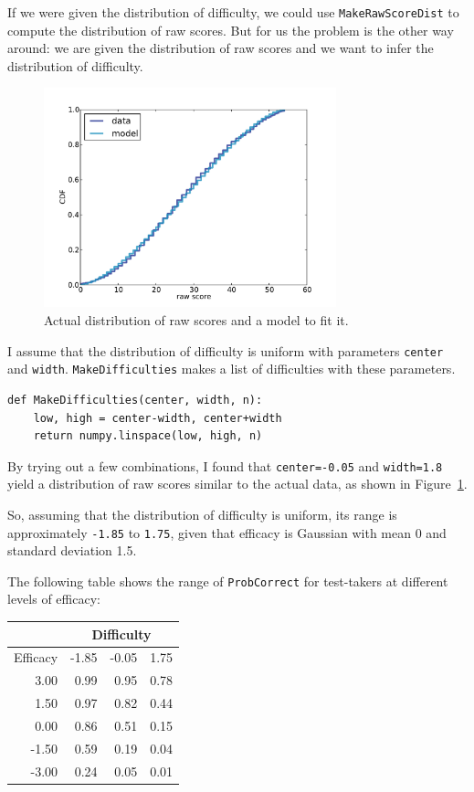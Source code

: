 \documentclass[12pt]{book}
\begin{document}
If we were given the distribution of difficulty, we could use
\verb"MakeRawScoreDist" to compute the distribution of raw scores.
But for us the problem is the other way around: we are given the
distribution of raw scores and we want to infer the distribution of
difficulty.

\begin{figure}
\centerline{\includegraphics[height=2.5in]{figs/sat_calibrate.pdf}}
\caption{Actual distribution of raw scores and a model to fit it.}
\label{fig.satcalibrate}
\end{figure}

I assume that the distribution of difficulty is uniform with
parameters {\tt center} and {\tt width}.  {\tt MakeDifficulties}
makes a list of difficulties with these parameters.

\begin{verbatim}
def MakeDifficulties(center, width, n):
    low, high = center-width, center+width
    return numpy.linspace(low, high, n)
\end{verbatim}

By trying out a few combinations, I found that
{\tt center=-0.05} and {\tt width=1.8} yield a distribution
of raw scores similar to the actual data, as shown in
Figure~\ref{fig.satcalibrate}.

So, assuming that the distribution of difficulty is uniform,
its range is approximately
{\tt -1.85} to {\tt 1.75}, given that
efficacy is Gaussian with mean 0 and standard deviation 1.5.

The following table shows the range of {\tt ProbCorrect} for
test-takers at different levels of efficacy:

\begin{tabular}{|r|r|r|r|}
\hline
           & \multicolumn{3}{|c|}{Difficulty} \\
\hline
Efficacy   & -1.85   &   -0.05   &      1.75  \\
\hline
3.00 &  0.99 &  0.95 &  0.78   \\
1.50 &  0.97 &  0.82 &  0.44   \\
0.00 &  0.86 &  0.51 &  0.15   \\
-1.50 &  0.59 &  0.19 &  0.04   \\
-3.00 &  0.24 &  0.05 &  0.01   \\
\hline
\end{tabular}
\end{document}
